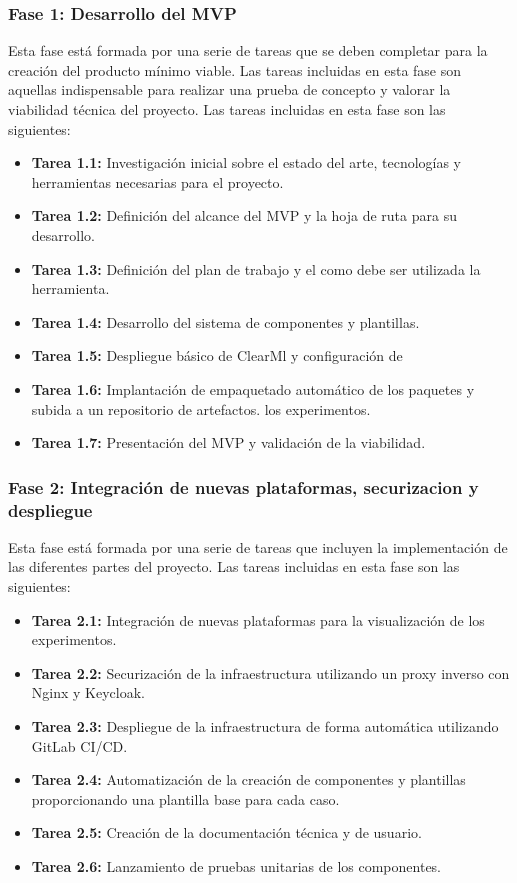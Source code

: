 \subsubsection{Fase 1: Desarrollo del MVP}
Esta fase está formada por una serie de tareas que se deben completar para
la creación del producto mínimo viable. Las tareas incluidas en esta fase son
aquellas indispensable para realizar una prueba de concepto y valorar la viabilidad
técnica del proyecto. Las tareas incluidas en esta fase son las siguientes:

\begin{itemize}
    \item \textbf{Tarea 1.1:} Investigación inicial sobre el estado del arte,
    tecnologías y herramientas necesarias para el proyecto.
    \item \textbf{Tarea 1.2:} Definición del alcance del MVP y la hoja de ruta
    para su desarrollo.
    \item \textbf{Tarea 1.3:} Definición del plan de trabajo y el como debe
    ser utilizada la herramienta.
    \item \textbf{Tarea 1.4:} Desarrollo del sistema de componentes y plantillas.
    \item \textbf{Tarea 1.5:} Despliegue básico de ClearMl y configuración de
    \item \textbf{Tarea 1.6:} Implantación de empaquetado automático de los
    paquetes y subida a un repositorio de artefactos.
    los experimentos.
    \item \textbf{Tarea 1.7:} Presentación del MVP y validación de la viabilidad.
\end{itemize}

\subsubsection{Fase 2: Integración de nuevas plataformas, securizacion y despliegue}
Esta fase está formada por una serie de tareas que incluyen la implementación
de las diferentes partes del proyecto. Las tareas incluidas en esta fase son
las siguientes:

\begin{itemize}
    \item \textbf{Tarea 2.1:} Integración de nuevas plataformas para la
    visualización de los experimentos.
    \item \textbf{Tarea 2.2:} Securización de la infraestructura utilizando
    un proxy inverso con Nginx y Keycloak.
    \item \textbf{Tarea 2.3:} Despliegue de la infraestructura de forma automática
    utilizando GitLab CI/CD.
    \item \textbf{Tarea 2.4:} Automatización de la creación de componentes y
    plantillas proporcionando una plantilla base para cada caso.
    \item \textbf{Tarea 2.5:} Creación de la documentación técnica y de usuario.
    \item \textbf{Tarea 2.6:} Lanzamiento de pruebas unitarias de los componentes.
\end{itemize}

